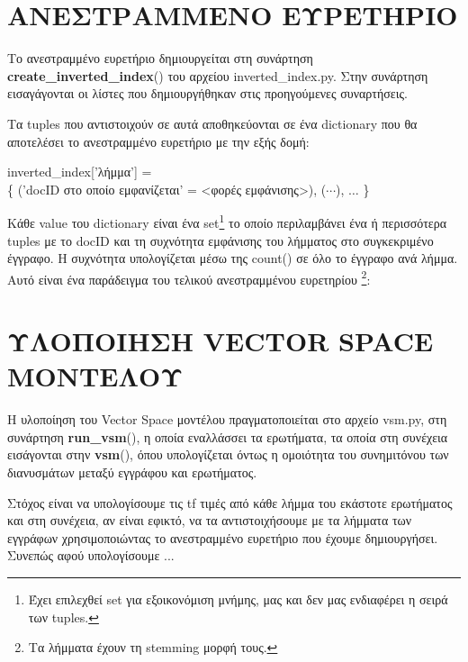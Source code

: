 \documentclass[12pt]{report}
\begin{document}
        \section{ΑΝΕΣΤΡΑΜΜΕΝΟ ΕΥΡΕΤΗΡΙΟ}

            Το ανεστραμμένο ευρετήριο δημιουργείται στη συνάρτηση {\fontCode\small \textbf{create\_inverted\_index}()} του αρχείου {\fontCode\small inverted\_index.py}.
            Στην συνάρτηση εισαγάγονται οι λίστες που δημιουργήθηκαν στις προηγούμενες συναρτήσεις.

            Τα tuples που αντιστοιχούν σε αυτά αποθηκεύονται σε ένα dictionary που θα αποτελέσει το ανεστραμμένο ευρετήριο με την εξής δομή:

                \begin{graycomment} \centering
                    {\fontCode\footnotesize inverted\_index['λήμμα'] = \\ \{ ('docID στο οποίο εμφανίζεται' = <φορές εμφάνισης>), (\(\cdots\)), \(\ldots\) \}}
                \end{graycomment}

            Κάθε value του dictionary είναι ένα set\footnote{Έχει επιλεχθεί set για εξοικονόμιση μνήμης, μας και δεν μας ενδιαφέρει η σειρά των tuples.} το οποίο περιλαμβάνει ένα ή περισσότερα tuples
            με το {\fontCode\small docID} και τη συχνότητα εμφάνισης του λήμματος στο συγκεκριμένο έγγραφο.
            Η συχνότητα υπολογίζεται μέσω της {\fontCode\small count()} σε όλο το έγγραφο ανά λήμμα. Αυτό είναι ένα παράδειγμα του τελικού ανεστραμμένου ευρετηρίου \footnote{Τα λήμματα έχουν τη stemming μορφή τους.}:


                \begin{graycomment} \centering
                    {\fontCode\scriptsize inverted\_index = \{\(\ldots\) 'coronari': {('01217', 2), ('00779', 1), ('00164', 1)}, \\ 'graft': {('00164', 1)}, 'mobil': {('00673', 2), 'strain': {('00179', 7), \(\ldots\)\} }
                \end{graycomment}

        \section{ΥΛΟΠΟΙΗΣΗ VECTOR SPACE ΜΟΝΤΕΛΟΥ}

            Η υλοποίηση του Vector Space μοντέλου πραγματοποιείται στο αρχείο {\fontCode\small vsm.py}, στη συνάρτηση {\fontCode\small \textbf{run\_vsm}()},
            η οποία εναλλάσσει τα ερωτήματα, τα οποία στη συνέχεια εισάγονται στην {\fontCode\small \textbf{vsm}()}, όπου υπολογίζεται όντως η ομοιότητα του συνημιτόνου των διανυσμάτων μεταξύ εγγράφου και ερωτήματος.

            Στόχος είναι να υπολογίσουμε τις tf τιμές από κάθε λήμμα του εκάστοτε ερωτήματος και στη συνέχεια, αν είναι εφικτό, να τα αντιστοιχήσουμε με τα λήμματα των εγγράφων χρησιμοποιώντας το ανεστραμμένο ευρετήριο που έχουμε δημιουργήσει.
            Συνεπώς αφού υπολογίσουμε ...
\end{document}
